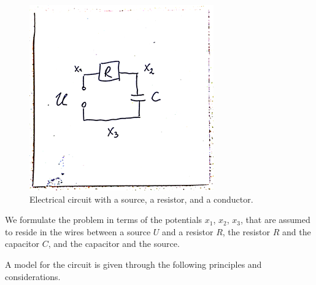 \documentclass[]{book}
\theoremstyle{definition}
\theoremstyle{definition}
\theoremstyle{definition}
\theoremstyle{definition}
\theoremstyle{remark}
\begin{document}
\begin{figure}

{\centering \includegraphics[width=0.4\linewidth]{pics/circuit} 

}

\caption{Electrical circuit with a source, a resistor, and a conductor.}\label{fig:circuit}
\end{figure}

We formulate the problem in terms of the potentials \(x_1\), \(x_2\), \(x_3\), that are assumed to reside in the wires between a source \(U\) and a resistor \(R\), the resistor \(R\) and the capacitor \(C\), and the capacitor and the source.

A model for the circuit is given through the following principles and considerations.
\end{document}
